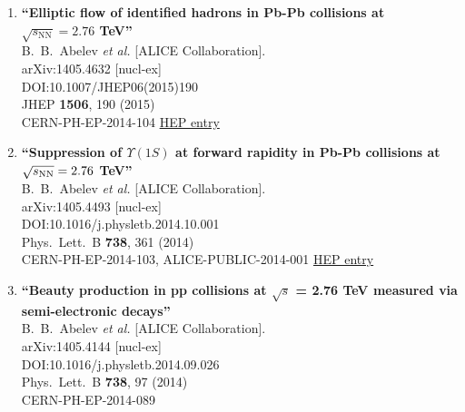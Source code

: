 \begin{enumerate}
{\bf ``Multiparticle azimuthal correlations in p -Pb and Pb-Pb collisions at the CERN Large Hadron Collider''}
  \\{}B.~B.~Abelev {\it et al.} [ALICE Collaboration].
  \\{}arXiv:1406.2474 [nucl-ex]
  \\{}DOI:10.1103/PhysRevC.90.054901
  \\{}Phys.\ Rev.\ C {\bf 90}, no. 5, 054901 (2014)
  \\{}CERN-PH-EP-2014-105
\href{http://inspirehep.net/record/1300038}{HEP entry}
\item%
{\bf ``Elliptic flow of identified hadrons in Pb-Pb collisions at $ \sqrt{s_{\mathrm{NN}}}=2.76 $ TeV''}
  \\{}B.~B.~Abelev {\it et al.} [ALICE Collaboration].
  \\{}arXiv:1405.4632 [nucl-ex]
  \\{}DOI:10.1007/JHEP06(2015)190
  \\{}JHEP {\bf 1506}, 190 (2015)
  \\{}CERN-PH-EP-2014-104
\href{http://inspirehep.net/record/1297103}{HEP entry}
\item%
{\bf ``Suppression of $\Upsilon (1S)$ at forward rapidity in Pb-Pb collisions at $\sqrt{s_{\rm NN}} = 2.76$ TeV''}
  \\{}B.~B.~Abelev {\it et al.} [ALICE Collaboration].
  \\{}arXiv:1405.4493 [nucl-ex]
  \\{}DOI:10.1016/j.physletb.2014.10.001
  \\{}Phys.\ Lett.\ B {\bf 738}, 361 (2014)
  \\{}CERN-PH-EP-2014-103, ALICE-PUBLIC-2014-001
\href{http://inspirehep.net/record/1297101}{HEP entry}
\item%
{\bf ``Beauty production in pp collisions at $\sqrt{s}$ = 2.76 TeV measured via semi-electronic decays''}
  \\{}B.~B.~Abelev {\it et al.} [ALICE Collaboration].
  \\{}arXiv:1405.4144 [nucl-ex]
  \\{}DOI:10.1016/j.physletb.2014.09.026
  \\{}Phys.\ Lett.\ B {\bf 738}, 97 (2014)
  \\{}CERN-PH-EP-2014-089

\end{enumerate}
